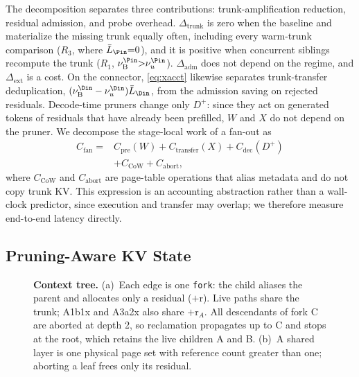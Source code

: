 The decomposition separates three contributions: trunk-amplification reduction, residual admission, and probe overhead.
$\Delta_{\mathrm{trunk}}$ is zero when the baseline and \sys materialize the missing trunk equally often, including every warm-trunk comparison ($R_3$, where $\bar L_{\Pin}{=}0$), and it is positive when concurrent siblings recompute the trunk ($R_1$, $\nu_{\mathrm{B}}^{\Pin}{>}\nu_u^{\Pin}$).
$\Delta_{\mathrm{adm}}$ does not depend on the regime, and $\Delta_{\mathrm{ext}}$ is a cost.
On the connector, \eqref{eq:xacct} likewise separates trunk-transfer deduplication, $(\nu_{\mathrm{B}}^{\Din}-\nu_u^{\Din})\bar L_{\Din}$, from the admission saving on rejected residuals.
Decode-time pruners change only $D^{+}$: since they act on generated tokens of residuals that have already been prefilled, $W$ and $X$ do not depend on the pruner.
We decompose the stage-local work of a fan-out as
\begin{equation}
\label{eq:tfan}
\begin{aligned}
C_{\mathrm{fan}}={}&C_{\mathrm{pre}}(W)+C_{\mathrm{transfer}}(X)+C_{\mathrm{dec}}(D^{+})\\
&+C_{\mathrm{CoW}}+C_{\mathrm{abort}},
\end{aligned}
\end{equation}
where $C_{\mathrm{CoW}}$ and $C_{\mathrm{abort}}$ are page-table operations that alias metadata and do not copy trunk KV.
This expression is an accounting abstraction rather than a wall-clock predictor, since execution and transfer may overlap; we therefore measure end-to-end latency directly.

\subsection{Pruning-Aware KV State}
\label{sec:kvstate}

\begin{figure}[t]
\centering
\resizebox{\textwidth}{!}{}
\caption{\textbf{Context tree.}
(a)~Each edge is one \texttt{fork}: the child aliases the parent and allocates only a residual ($+$r).
Live paths share the trunk; A1b1x and A3a2x also share $+$r$_A$.
All descendants of fork C are aborted at depth 2, so reclamation propagates up to C and stops at the root, which retains the live children A and B.
(b)~A shared layer is one physical page set with reference count greater than one; aborting a leaf frees only its residual.}
\label{fig:tree}
\end{figure}

